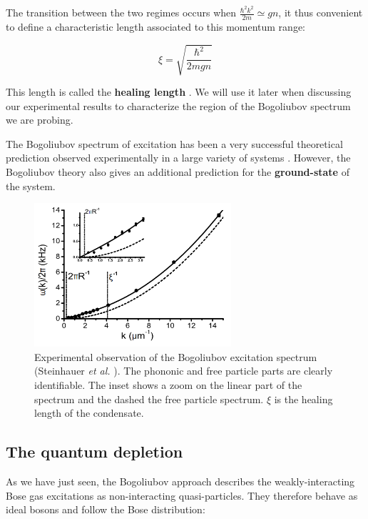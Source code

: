 The transition between the two regimes occurs when $\frac{\hbar^2 k^2}{2m} \simeq gn$, it thus convenient to define a characteristic length associated to this momentum range:

\begin{equation}
    \xi = \sqrt{\frac{\hbar^2}{2mgn}}
\end{equation}

This length is called the \textbf{healing length} . We will use it later when discussing our experimental results to characterize the region of the Bogoliubov spectrum we are probing.

The Bogoliubov spectrum of excitation has been a very successful theoretical prediction observed experimentally in a large variety of systems \cite{miller1962, steinhauer2002excitation, ozeri2005, fontaine2018, stepanov2019}. However, the Bogoliubov theory also gives an additional prediction for the \textbf{ground-state} of the system.

\begin{figure}
    \centering
    \includegraphics[width=0.65\textwidth]{Fig/Chapter1/bogo_steinhauer.png}
    \caption{Experimental observation of the Bogoliubov excitation spectrum (Steinhauer {\it et al.} \cite{steinhauer2002excitation}). The phononic and free particle parts are clearly identifiable. The inset shows a zoom on the linear part of the spectrum and the dashed the free particle spectrum. $\xi$ is the healing length of the condensate.}
    \label{fig:my_label}
\end{figure}

\subsection{The quantum depletion}

As we have just seen, the Bogoliubov approach describes the weakly-interacting Bose gas excitations as non-interacting quasi-particles. They therefore behave as ideal bosons and follow the Bose distribution:

